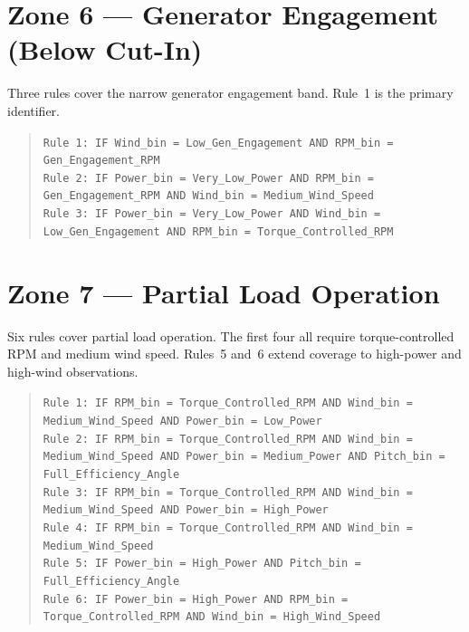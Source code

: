 {\section*{Zone 6 --- Generator Engagement (Below Cut-In)}
Three rules cover the narrow generator engagement band. Rule~1 is the primary identifier.
\begin{quote}
\texttt{Rule 1: IF Wind\_bin = Low\_Gen\_Engagement AND RPM\_bin = Gen\_Engagement\_RPM}\\
\texttt{Rule 2: IF Power\_bin = Very\_Low\_Power AND RPM\_bin = Gen\_Engagement\_RPM AND Wind\_bin = Medium\_Wind\_Speed}\\
\texttt{Rule 3: IF Power\_bin = Very\_Low\_Power AND Wind\_bin = Low\_Gen\_Engagement AND RPM\_bin = Torque\_Controlled\_RPM}
\end{quote}

\section*{Zone 7 --- Partial Load Operation}
Six rules cover partial load operation. The first four all require torque-controlled RPM
and medium wind speed. Rules~5 and~6 extend coverage to high-power and high-wind
observations.
\begin{quote}
\texttt{Rule 1: IF RPM\_bin = Torque\_Controlled\_RPM AND Wind\_bin = Medium\_Wind\_Speed AND Power\_bin = Low\_Power}\\
\texttt{Rule 2: IF RPM\_bin = Torque\_Controlled\_RPM AND Wind\_bin = Medium\_Wind\_Speed AND Power\_bin = Medium\_Power AND Pitch\_bin = Full\_Efficiency\_Angle}\\
\texttt{Rule 3: IF RPM\_bin = Torque\_Controlled\_RPM AND Wind\_bin = Medium\_Wind\_Speed AND Power\_bin = High\_Power}\\
\texttt{Rule 4: IF RPM\_bin = Torque\_Controlled\_RPM AND Wind\_bin = Medium\_Wind\_Speed}\\
\texttt{Rule 5: IF Power\_bin = High\_Power AND Pitch\_bin = Full\_Efficiency\_Angle}\\
\texttt{Rule 6: IF Power\_bin = High\_Power AND RPM\_bin = Torque\_Controlled\_RPM AND Wind\_bin = High\_Wind\_Speed}
\end{quote}

}
